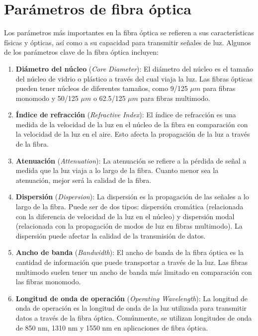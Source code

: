 \documentclass[
	12pt, %
	fleqn, %
	a4paper, %
	oneside, %
]{LegrandOrangeBook}
\begin{document}
\section{Parámetros de fibra óptica}
Los parámetros más importantes en la fibra óptica se refieren a sus características físicas y ópticas, así como a su capacidad para transmitir señales de luz. Algunos de los parámetros clave de la fibra óptica incluyen:
\begin{enumerate}
\item \textbf{Diámetro del núcleo} (\textit{Core Diameter}): El diámetro del núcleo es el tamaño del núcleo de vidrio o plástico a través del cual viaja la luz. Las fibras ópticas pueden tener núcleos de diferentes tamaños, como 9/125 $\mu m$ para fibras monomodo y 50/125 $\mu m$ o 62.5/125 $\mu m$ para fibras multimodo.

\item \textbf{Índice de refracción} (\textit{Refractive Index}): El índice de refracción es una medida de la velocidad de la luz en el núcleo de la fibra en comparación con la velocidad de la luz en el aire. Esto afecta la propagación de la luz a través de la fibra.

\item \textbf{Atenuación} (\textit{Attenuation}): La atenuación se refiere a la pérdida de señal a medida que la luz viaja a lo largo de la fibra. Cuanto menor sea la atenuación, mejor será la calidad de la fibra.

\item \textbf{Dispersión} (\textit{Dispersion}): La dispersión es la propagación de las señales a lo largo de la fibra. Puede ser de dos tipos: dispersión cromática (relacionada con la diferencia de velocidad de la luz en el núcleo) y dispersión modal (relacionada con la propagación de modos de luz en fibras multimodo). La dispersión puede afectar la calidad de la transmisión de datos.

\item \textbf{Ancho de banda} (\textit{Bandwidth}): El ancho de banda de la fibra óptica es la cantidad de información que puede transportar a través de la luz. Las fibras multimodo suelen tener un ancho de banda más limitado en comparación con las fibras monomodo.

\item \textbf{Longitud de onda de operación} (\textit{Operating Wavelength}): La longitud de onda de operación es la longitud de onda de la luz utilizada para transmitir datos a través de la fibra óptica. Comúnmente, se utilizan longitudes de onda de 850 nm, 1310 nm y 1550 nm en aplicaciones de fibra óptica.


\end{enumerate}
\end{document}

